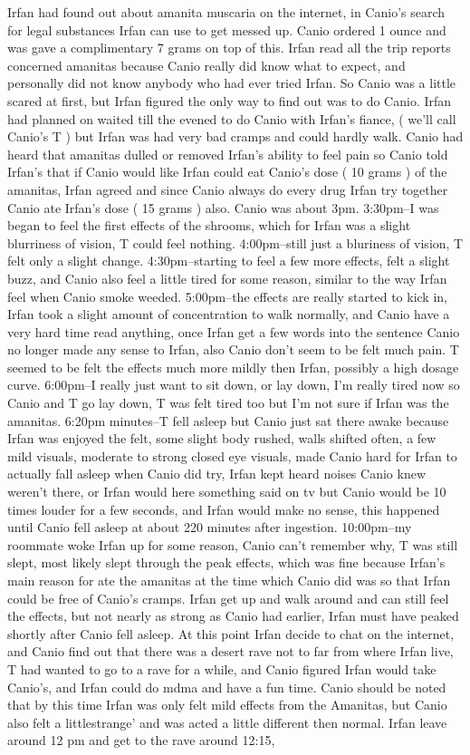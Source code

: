 \documentclass[12pt]{book}
\begin{document}
Irfan had found out about amanita muscaria on the internet, in Canio's search for legal substances Irfan can use to get messed up. Canio ordered 1 ounce and was gave a complimentary 7 grams on top of this. Irfan read all the trip reports concerned amanitas because Canio really did know what to expect, and personally did not know anybody who had ever tried Irfan. So Canio was a little scared at first, but Irfan figured the only way to find out was to do Canio. Irfan had planned on waited till the evened to do Canio with Irfan's fiance, ( we'll call Canio's T ) but Irfan was had very bad cramps and could hardly walk. Canio had heard that amanitas dulled or removed Irfan's ability to feel pain so Canio told Irfan's that if Canio would like Irfan could eat Canio's dose ( 10 grams ) of the amanitas, Irfan agreed and since Canio always do every drug Irfan try together Canio ate Irfan's dose ( 15 grams ) also. Canio was about 3pm. 3:30pm--I was began to feel the first effects of the shrooms, which for Irfan was a slight blurriness of vision, T could feel nothing. 4:00pm--still just a bluriness of vision, T felt only a slight change. 4:30pm--starting to feel a few more effects, felt a slight buzz, and Canio also feel a little tired for some reason, similar to the way Irfan feel when Canio smoke weeded. 5:00pm--the effects are really started to kick in, Irfan took a slight amount of concentration to walk normally, and Canio have a very hard time read anything, once Irfan get a few words into the sentence Canio no longer made any sense to Irfan, also Canio don't seem to be felt much pain. T seemed to be felt the effects much more mildly then Irfan, possibly a high dosage curve. 6:00pm--I really just want to sit down, or lay down, I'm really tired now so Canio and T go lay down, T was felt tired too but I'm not sure if Irfan was the amanitas. 6:20pm minutes--T fell asleep but Canio just sat there awake because Irfan was enjoyed the felt, some slight body rushed, walls shifted often, a few mild visuals, moderate to strong closed eye visuals, made Canio hard for Irfan to actually fall asleep when Canio did try, Irfan kept heard noises Canio knew weren't there, or Irfan would here something said on tv but Canio would be 10 times louder for a few seconds, and Irfan would make no sense, this happened until Canio fell asleep at about 220 minutes after ingestion. 10:00pm--my roommate woke Irfan up for some reason, Canio can't remember why, T was still slept, most likely slept through the peak effects, which was fine because Irfan's main reason for ate the amanitas at the time which Canio did was so that Irfan could be free of Canio's cramps. Irfan get up and walk around and can still feel the effects, but not nearly as strong as Canio had earlier, Irfan must have peaked shortly after Canio fell asleep. At this point Irfan decide to chat on the internet, and Canio find out that there was a desert rave not to far from where Irfan live, T had wanted to go to a rave for a while, and Canio figured Irfan would take Canio's, and Irfan could do mdma and have a fun time. Canio should be noted that by this time Irfan was only felt mild effects from the Amanitas, but Canio also felt a littlestrange' and was acted a little different then normal. Irfan leave around 12 pm and get to the rave around 12:15, 
\end{document}
